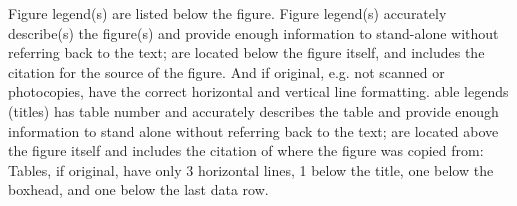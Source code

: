 Figure legend(s) are listed below the figure. Figure legend(s) accurately describe(s) the figure(s) and provide enough information to stand-alone without referring back to the text; are located below the figure itself, and includes the citation for the source of the figure. And if original, e.g. not scanned or photocopies, have the correct horizontal and vertical line formatting. able legends (titles) has table number and accurately describes the table and provide enough information to stand alone without referring back to the text; are located above the figure itself and includes the citation of where the figure was copied from: Tables, if original, have only 3 horizontal lines, 1 below the title, one below the boxhead, and one below the last data row. \\
